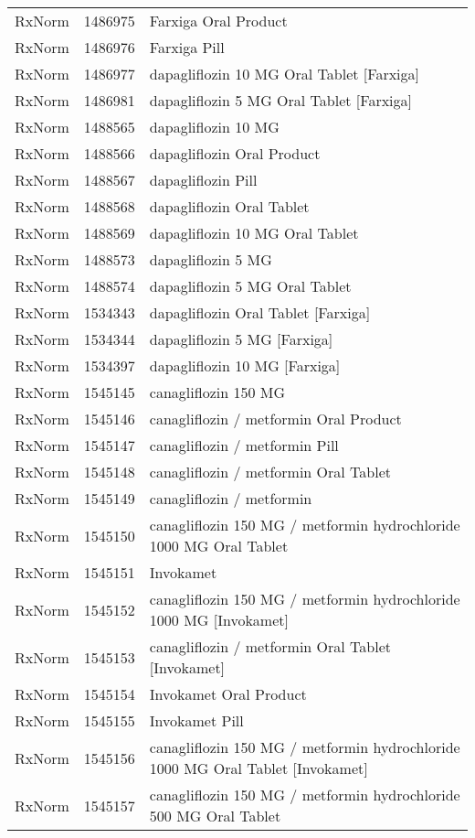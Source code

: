 \begin{longtable}{p{}p{}p{}}
  RxNorm & 1486975 & Farxiga Oral Product \\ 
  RxNorm & 1486976 & Farxiga Pill \\ 
  RxNorm & 1486977 & dapagliflozin 10 MG Oral Tablet [Farxiga] \\ 
  RxNorm & 1486981 & dapagliflozin 5 MG Oral Tablet [Farxiga] \\ 
  RxNorm & 1488565 & dapagliflozin 10 MG \\ 
  RxNorm & 1488566 & dapagliflozin Oral Product \\ 
  RxNorm & 1488567 & dapagliflozin Pill \\ 
  RxNorm & 1488568 & dapagliflozin Oral Tablet \\ 
  RxNorm & 1488569 & dapagliflozin 10 MG Oral Tablet \\ 
  RxNorm & 1488573 & dapagliflozin 5 MG \\ 
  RxNorm & 1488574 & dapagliflozin 5 MG Oral Tablet \\ 
  RxNorm & 1534343 & dapagliflozin Oral Tablet [Farxiga] \\ 
  RxNorm & 1534344 & dapagliflozin 5 MG [Farxiga] \\ 
  RxNorm & 1534397 & dapagliflozin 10 MG [Farxiga] \\ 
  RxNorm & 1545145 & canagliflozin 150 MG \\ 
  RxNorm & 1545146 & canagliflozin / metformin Oral Product \\ 
  RxNorm & 1545147 & canagliflozin / metformin Pill \\ 
  RxNorm & 1545148 & canagliflozin / metformin Oral Tablet \\ 
  RxNorm & 1545149 & canagliflozin / metformin \\ 
  RxNorm & 1545150 & canagliflozin 150 MG / metformin hydrochloride 1000 MG Oral Tablet \\ 
  RxNorm & 1545151 & Invokamet \\ 
  RxNorm & 1545152 & canagliflozin 150 MG / metformin hydrochloride 1000 MG [Invokamet] \\ 
  RxNorm & 1545153 & canagliflozin / metformin Oral Tablet [Invokamet] \\ 
  RxNorm & 1545154 & Invokamet Oral Product \\ 
  RxNorm & 1545155 & Invokamet Pill \\ 
  RxNorm & 1545156 & canagliflozin 150 MG / metformin hydrochloride 1000 MG Oral Tablet [Invokamet] \\ 
  RxNorm & 1545157 & canagliflozin 150 MG / metformin hydrochloride 500 MG Oral Tablet \\ 

\end{longtable}
